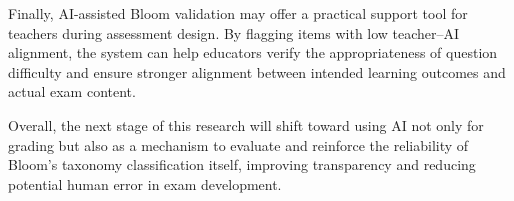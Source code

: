 Finally, AI-assisted Bloom validation may offer a practical
support tool for teachers during assessment design. By
flagging items with low teacher–AI alignment, the system can
help educators verify the appropriateness of question
difficulty and ensure stronger alignment between intended
learning outcomes and actual exam content.

Overall, the next stage of this research will shift toward
using AI not only for grading but also as a mechanism to
evaluate and reinforce the reliability of Bloom’s taxonomy
classification itself, improving transparency and reducing
potential human error in exam development.